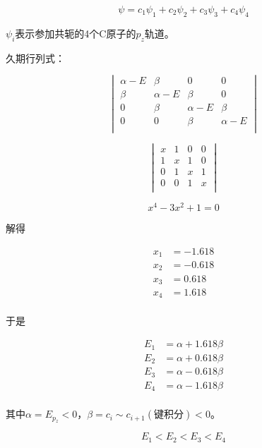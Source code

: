 \begin{equation*}
    \psi = c_1 \psi_1 + c_2 \psi_2 + c_3 \psi_3 + c_4 \psi_4
\end{equation*}

$\psi_i$表示参加共轭的4个C原子的$p_z$轨道。

久期行列式：

\begin{equation*}
    \begin{vmatrix}
        \alpha - E & \beta & 0 & 0 \\
        \beta & \alpha - E & \beta & 0 \\
        0 & \beta  & \alpha - E & \beta \\
        0 & 0 & \beta & \alpha - E \\ 
    \end{vmatrix}
\end{equation*}

\begin{equation*}
    \begin{vmatrix*}
        x & 1 & 0 & 0 \\
        1 & x & 1 & 0 \\
        0 & 1 & x & 1 \\
        0 & 0 & 1 & x \\
    \end{vmatrix*}
\end{equation*}


\begin{equation*}
    x^4 - 3x^2 + 1 = 0
\end{equation*}

解得

\begin{align*}
    x_1 &= -1.618 \\ 
    x_2 &= -0.618 \\
    x_3 &= 0.618 \\
    x_4 &= 1.618 \\
\end{align*}

于是

\begin{align*}
    E_1 &= \alpha + 1.618\beta \\ 
    E_2 &= \alpha + 0.618\beta \\
    E_3 &= \alpha - 0.618\beta \\
    E_4 &= \alpha - 1.618\beta \\
\end{align*}

其中$\alpha = E_{p_z} < 0$，$\beta = c_i \sim c_{i+1} (\mbox{键积分}) < 0$。


\begin{equation*}
    E_1 < E_2 < E_3 < E_4
\end{equation*}